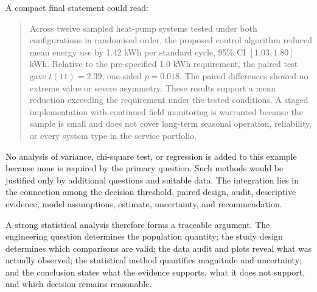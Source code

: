 \Needspace{0.38\textheight}
A compact final statement could read:

\begin{quote}
Across twelve sampled heat-pump systems tested under both configurations in randomised order, the proposed control algorithm reduced mean energy use by 1.42 kWh per standard cycle, 95\% CI $[1.03,1.80]$ kWh. Relative to the pre-specified 1.0 kWh requirement, the paired test gave $t(11)=2.39$, one-sided $p=0.018$. The paired differences showed no extreme value or severe asymmetry. These results support a mean reduction exceeding the requirement under the tested conditions. A staged implementation with continued field monitoring is warranted because the sample is small and does not cover long-term seasonal operation, reliability, or every system type in the service portfolio.
\end{quote}

No analysis of variance, chi-square test, or regression is added to this example because none is required by the primary question. Such methods would be justified only by additional questions and suitable data. The integration lies in the connection among the decision threshold, paired design, audit, descriptive evidence, model assumptions, estimate, uncertainty, and recommendation.

A strong statistical analysis therefore forms a traceable argument. The engineering question determines the population quantity; the study design determines which comparisons are valid; the data audit and plots reveal what was actually observed; the statistical method quantifies magnitude and uncertainty; and the conclusion states what the evidence supports, what it does not support, and which decision remains reasonable.
